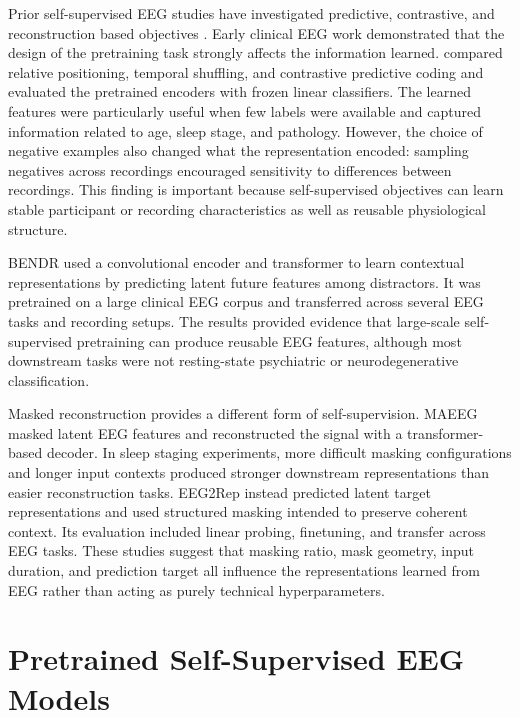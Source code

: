 Prior self-supervised EEG studies have investigated predictive, contrastive, and reconstruction based objectives \parencite{wengSelfSupervisedLearningElectroencephalogram2024}. Early clinical EEG work demonstrated that the design of the pretraining task strongly affects the information learned. \textcite{banvilleUncoveringStructureClinical2020} compared relative positioning, temporal shuffling, and contrastive predictive coding and evaluated the pretrained encoders with frozen linear classifiers. The learned features were particularly useful when few labels were available and captured information related to age, sleep stage, and pathology. However, the choice of negative examples also changed what the representation encoded: sampling negatives across recordings encouraged sensitivity to differences between recordings. This finding is important because self-supervised objectives can learn stable participant or recording characteristics as well as reusable physiological structure.

BENDR \parencite{kostasBENDRUsingTransformers2021} used a convolutional encoder and transformer to learn contextual representations by predicting latent future features among distractors. It was pretrained on a large clinical EEG corpus and transferred across several EEG tasks and recording setups. The results provided evidence that large-scale self-supervised pretraining can produce reusable EEG features, although most downstream tasks were not resting-state psychiatric or neurodegenerative classification.

Masked reconstruction provides a different form of self-supervision. MAEEG \parencite{chienMAEEGMaskedAutoencoder2022} masked latent EEG features and reconstructed the signal with a transformer-based decoder. In sleep staging experiments, more difficult masking configurations and longer input contexts produced stronger downstream representations than easier reconstruction tasks. EEG2Rep \parencite{foumaniEEG2RepEnhancingSelfSupervised2024} instead predicted latent target representations and used structured masking intended to preserve coherent context. Its evaluation included linear probing, finetuning, and transfer across EEG tasks. These studies suggest that masking ratio, mask geometry, input duration, and prediction target all influence the representations learned from EEG rather than acting as purely technical hyperparameters.

\section{Pretrained Self-Supervised EEG Models}\label{sec:rel_foundation}

